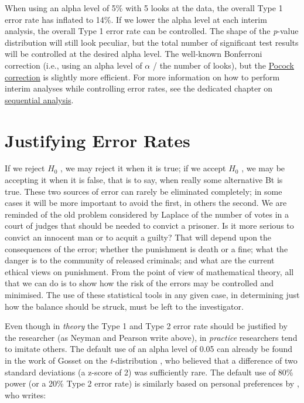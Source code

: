 \documentclass[
  oneside]{krantz}
\renewenvironment{quote}{\begin{VF}}{\end{VF}}
\begin{document}
When using an alpha level of 5\% with 5 looks at the data, the overall Type 1 error rate has inflated to 14\%. If we lower the alpha level at each interim analysis, the overall Type 1 error rate can be controlled. The shape of the \emph{p}-value distribution will still look peculiar, but the total number of significant test results will be controlled at the desired alpha level. The well-known Bonferroni correction (i.e., using an alpha level of \(\alpha\) / the number of looks), but the \href{https://en.wikipedia.org/wiki/Pocock_boundary}{Pocock correction} is slightly more efficient. For more information on how to perform interim analyses while controlling error rates, see the dedicated chapter on \protect\hyperlink{sequential}{sequential analysis}.

\hypertarget{justifyerrorrate}{%
\section{Justifying Error Rates}\label{justifyerrorrate}}

\begin{quote}
If we reject \(H_0\) , we may reject it when it is true; if we accept \(H_0\) , we may be accepting it when it is false, that is to say, when really some alternative Bt is true. These two sources of error can rarely be eliminated completely; in some cases it will be more important to avoid the first, in others the second. We are reminded of the old problem considered by Laplace of the number of votes in a court of judges that should be needed to convict a prisoner. Is it more serious to convict an innocent man or to acquit a guilty? That will depend upon the consequences of the error; whether the punishment is death or a fine; what the danger is to the community of released criminals; and what are the current ethical views on punishment. From the point of view of mathematical theory, all that we can do is to show how the risk of the errors may be controlled and minimised. The use of these statistical tools in any given case, in determining just how the balance should be struck, must be left to the investigator.
\end{quote}

Even though in \emph{theory} the Type 1 and Type 2 error rate should be justified by the researcher (as Neyman and Pearson \citeyearpar{neyman_problem_1933} write above), in \emph{practice} researchers tend to imitate others. The default use of an alpha level of 0.05 can already be found in the work of Gosset on the \emph{t}-distribution \citep{cowles_origins_1982, kennedy-shaffer_before_2019}, who believed that a difference of two standard deviations (a z-score of 2) was sufficiently rare. The default use of 80\% power (or a 20\% Type 2 error rate) is similarly based on personal preferences by \citet{cohen_statistical_1988}, who writes:
\end{document}

